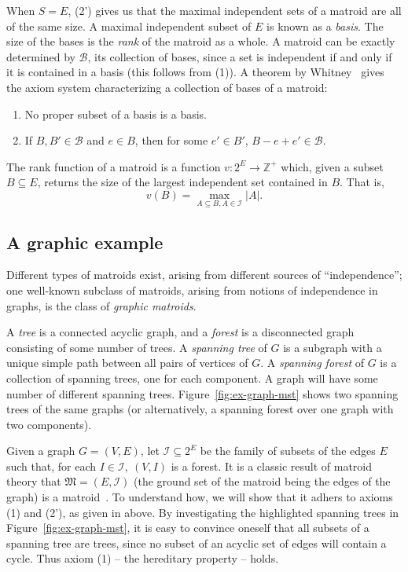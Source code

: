 When $S=E$, (2') gives us that the maximal independent sets of a matroid are all of the same size. A maximal independent subset of $E$ is known as a \textit{basis}. The size of the bases is the \textit{rank} of the matroid as a whole.  A matroid can be exactly determined by $\mathcal{B}$, its collection of bases, since a set is independent if and only if it is contained in a basis (this follows from (1)). A theorem by Whitney~\cite{whitney-1935} gives the axiom system characterizing a collection of bases of a matroid: 
\begin{enumerate}
  \item No proper subset of a basis is a basis.
  \item If $B, B'\in \mathcal{B}$ and $e \in B$, then for some $e'\in B'$, $B-e+e'\in\mathcal{B}$.
\end{enumerate} 

The rank function of a matroid is a function $v:2^E \to \mathbb{Z}^+$ which, given a subset $B\subseteq E$, returns the size of the largest independent set contained in $B$. That is, $$v(B) = \max_{A \subseteq B, A\in \mathcal{I}}|A|.$$

\subsection{A graphic example}
Different types of matroids exist, arising from different sources of ``independence''; one well-known subclass of matroids, arising from notions of independence in graphs, is the class of \textit{graphic matroids}.

A \textit{tree} is a connected acyclic graph, and a \textit{forest} is a disconnected graph consisting of some number of trees. A \textit{spanning tree} of $G$ is a subgraph with a unique simple path between all pairs of vertices of $G$. A \textit{spanning forest} of $G$ is a collection of spanning trees, one for each component. A graph will have some number of different spanning trees. Figure~\ref{fig:ex-graph-mst} shows two spanning trees of the same graphs (or alternatively, a spanning forest over one graph with two components).

Given a graph $G=(V,E)$, let $\mathcal{I} \subseteq 2^E$ be the family of subsets of the edges $E$ such that, for each $I \in \mathcal{I},\ (V, I)$ is a forest. It is a classic result of matroid theory that $\mathfrak{M} = (E, \mathcal{I})$ (the ground set of the matroid being the edges of the graph) is a matroid~\cite[p.~657]{schrijver-2003}. To understand how, we will show that it adhers to axioms (1) and (2'), as given in above. By investigating the highlighted spanning trees in Figure~\ref{fig:ex-graph-mst}, it is easy to convince oneself that all subsets of a spanning tree are trees, since no subset of an acyclic set of edges will contain a cycle. Thus axiom (1) -- the hereditary property -- holds. 

